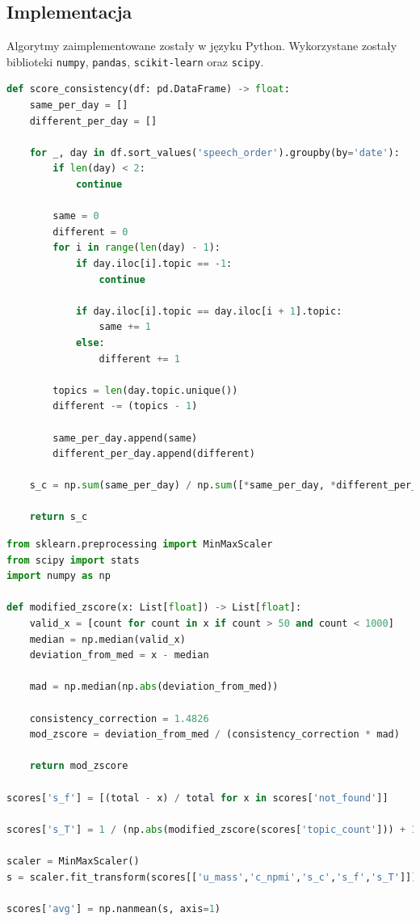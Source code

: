 	\subsection{Implementacja}
		Algorytmy zaimplementowane zostały w języku Python.
		Wykorzystane zostały biblioteki \verb|numpy|, \verb|pandas|, \verb|scikit-learn| oraz \verb|scipy|.

		\begin{lstlisting}[label=lst:score_consistency,language=Python,caption=Funkcja obliczająca spójność s\_c]
def score_consistency(df: pd.DataFrame) -> float:
	same_per_day = []
	different_per_day = []

	for _, day in df.sort_values('speech_order').groupby(by='date'):
		if len(day) < 2:
			continue

		same = 0
		different = 0
		for i in range(len(day) - 1):
			if day.iloc[i].topic == -1:
				continue

			if day.iloc[i].topic == day.iloc[i + 1].topic:
				same += 1
			else:
				different += 1

		topics = len(day.topic.unique())
		different -= (topics - 1)

		same_per_day.append(same)
		different_per_day.append(different)

	s_c = np.sum(same_per_day) / np.sum([*same_per_day, *different_per_day])

	return s_c
		\end{lstlisting}

		\begin{lstlisting}[label=lst:final_score,language=Python,caption=Obliczanie finalnej oceny spójności tematów dla listy modeli]
from sklearn.preprocessing import MinMaxScaler
from scipy import stats
import numpy as np

def modified_zscore(x: List[float]) -> List[float]:
	valid_x = [count for count in x if count > 50 and count < 1000]
	median = np.median(valid_x)
	deviation_from_med = x - median

	mad = np.median(np.abs(deviation_from_med))

	consistency_correction = 1.4826
	mod_zscore = deviation_from_med / (consistency_correction * mad)

	return mod_zscore

scores['s_f'] = [(total - x) / total for x in scores['not_found']]

scores['s_T'] = 1 / (np.abs(modified_zscore(scores['topic_count'])) + 1)

scaler = MinMaxScaler()
s = scaler.fit_transform(scores[['u_mass','c_npmi','s_c','s_f','s_T']])

scores['avg'] = np.nanmean(s, axis=1)
		\end{lstlisting}

